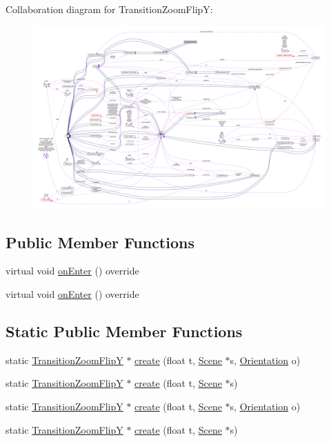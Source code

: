 Collaboration diagram for Transition\+Zoom\+FlipY\+:
\nopagebreak
\begin{figure}[H]
\begin{center}
\leavevmode
\includegraphics[width=350pt]{classTransitionZoomFlipY__coll__graph}
\end{center}
\end{figure}
\subsection*{Public Member Functions}
\begin{DoxyCompactItemize}
\item 
virtual void \hyperlink{classTransitionZoomFlipY_a6909fa709a95fbd9b3556399ee00c215}{on\+Enter} () override
\item 
virtual void \hyperlink{classTransitionZoomFlipY_a0a91781c926ef8dd5942897c599dc961}{on\+Enter} () override
\end{DoxyCompactItemize}
\subsection*{Static Public Member Functions}
\begin{DoxyCompactItemize}
\item 
static \hyperlink{classTransitionZoomFlipY}{Transition\+Zoom\+FlipY} $\ast$ \hyperlink{classTransitionZoomFlipY_a1082747ec2484feb7e69e09eae7f5668}{create} (float t, \hyperlink{classScene}{Scene} $\ast$s, \hyperlink{classTransitionScene_a0b2b247806fb10a20de0cbc554210c4d}{Orientation} o)
\item 
static \hyperlink{classTransitionZoomFlipY}{Transition\+Zoom\+FlipY} $\ast$ \hyperlink{classTransitionZoomFlipY_a7d7da6fbf36e2855edeef8324e43e379}{create} (float t, \hyperlink{classScene}{Scene} $\ast$s)
\item 
static \hyperlink{classTransitionZoomFlipY}{Transition\+Zoom\+FlipY} $\ast$ \hyperlink{classTransitionZoomFlipY_a6929410992a9c615076e00b215ff87da}{create} (float t, \hyperlink{classScene}{Scene} $\ast$s, \hyperlink{classTransitionScene_a0b2b247806fb10a20de0cbc554210c4d}{Orientation} o)
\item 
static \hyperlink{classTransitionZoomFlipY}{Transition\+Zoom\+FlipY} $\ast$ \hyperlink{classTransitionZoomFlipY_aa00ace509de097af6ec08b1d471d4551}{create} (float t, \hyperlink{classScene}{Scene} $\ast$s)
\end{DoxyCompactItemize}
